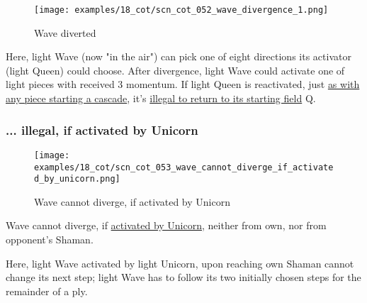 \clearpage %

\vspace*{-2.1\baselineskip}
\noindent
\begin{figure}[!h]
\texttt{[image: examples/18\_cot/scn\_cot\_052\_wave\_divergence\_1.png]}
\vspace*{-1.3\baselineskip}
\caption{Wave diverted}
\label{fig:scn_cot_052_wave_divergence_1}
\end{figure}

\vspace*{-0.4\baselineskip}
Here, light Wave (now "in the air") can pick one of eight directions its activator
(light Queen) could choose. After divergence, light Wave could activate one of light
pieces with received 3 momentum. If light Queen is reactivated, just
\hyperref[fig:scn_mv_47_static_move_is_illegal_init]{as with any piece starting a cascade}, it's
\hyperref[fig:scn_cot_031_own_shaman_is_divergent_end]{illegal to return to its starting field} Q.

\clearpage %

\subsubsection*{... illegal, if activated by Unicorn}
\label{sec:Conquest of Tlalocan/Divergence/... illegal, if activated by Unicorn}

\vspace*{-1.4\baselineskip}
\noindent
\begin{figure}[!h]
\texttt{[image: examples/18\_cot/scn\_cot\_053\_wave\_cannot\_diverge\_if\_activated\_by\_unicorn.png]}
\vspace*{-1.3\baselineskip}
\caption{Wave cannot diverge, if activated by Unicorn}
\label{fig:scn_cot_053_wave_cannot_diverge_if_activated_by_unicorn}
\end{figure}

\vspace*{-0.5\baselineskip}
Wave cannot diverge, if
\hyperref[fig:scn_mv_25_wave_activation_by_unicorn_first_step]{activated by Unicorn},
neither from own, nor from opponent's Shaman.

Here, light Wave activated by light Unicorn, upon reaching own Shaman cannot change
its next step; light Wave has to follow its two initially chosen steps for the
remainder of a ply.

